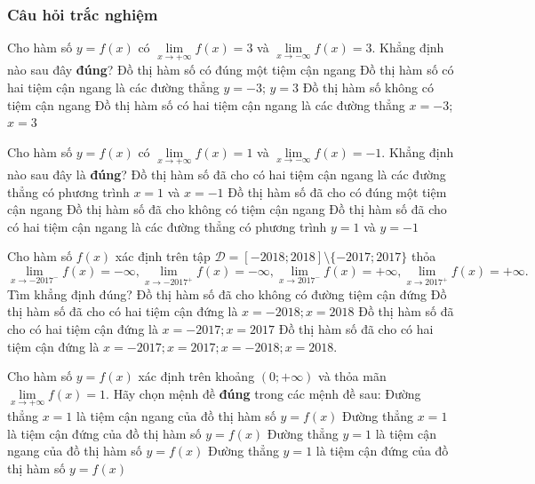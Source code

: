 \subsubsection{Câu hỏi trắc nghiệm}
\begin{ex}%
	Cho hàm số $y=f(x)$ có $\lim\limits_{x\to+\infty} f(x)=3$ và $\lim\limits_{x\to-\infty} f(x)=3$. Khẳng định nào sau đây \textbf{đúng}?
	\choice
	{\True Đồ thị hàm số có đúng một tiệm cận ngang}
	{Đồ thị hàm số có hai tiệm cận ngang là các đường thẳng $y=-3$; $y=3$}
	{Đồ thị hàm số không có tiệm cận ngang}
	{Đồ thị hàm số có hai tiệm cận ngang là các đường thẳng $x=-3$; $x=3$}
\end{ex}
\begin{ex}%
	Cho hàm số $y=f(x)$ có $\lim\limits_{x\to+\infty} f(x)=1$ và $\lim\limits_{x\to-\infty} f(x)=-1$. Khẳng định nào sau đây là \textbf{đúng}?
	\choice
	{Đồ thị hàm số đã cho có hai tiệm cận ngang là các đường thẳng có phương trình $x=1$ và $x=-1$}
	{Đồ thị hàm số đã cho có đúng một tiệm cận ngang}
	{Đồ thị hàm số đã cho không có tiệm cận ngang}
	{\True Đồ thị hàm số đã cho có hai tiệm cận ngang là các đường thẳng có phương trình $y=1$ và $y=-1$}
\end{ex}
\begin{ex}%
	Cho hàm số $f(x)$ xác định trên tập $\mathscr{D}=[-2018;2018]\setminus\{-2017;2017\}$ thỏa
	$$\lim\limits_{x\to-{2017}^-} f(x)=-\infty, \lim\limits_{x\to-{2017}^+} f(x)=-\infty, \lim\limits_{x\to{2017}^-} f(x)=+\infty, \lim\limits_{x\to{2017}^+} f(x)=+\infty.$$
	Tìm khẳng định đúng?
	\choice
	{Đồ thị hàm số đã cho không có đường tiệm cận đứng}
	{Đồ thị hàm số đã cho có hai tiệm cận đứng là $x=-2018;x=2018$}
	{\True Đồ thị hàm số đã cho có hai tiệm cận đứng là $x=-2017;x=2017$}
	{Đồ thị hàm số đã cho có hai tiệm cận đứng là $x=-2017;x=2017;x=-2018;x=2018$.}
\end{ex}
\begin{ex}%
	Cho hàm số $y=f(x)$ xác định trên khoảng $(0;+\infty)$ và thỏa mãn $\lim\limits_{x\to+\infty} f(x)=1$. Hãy chọn mệnh đề \textbf{đúng} trong các mệnh đề sau: 
	\choice
	{Đường thẳng $x=1$ là tiệm cận ngang của đồ thị hàm số $y=f(x)$}
	{Đường thẳng $x=1$ là tiệm cận đứng của đồ thị hàm số $y=f(x)$}
	{\True Đường thẳng $y=1$ là tiệm cận ngang của đồ thị hàm số $y=f(x)$}
	{Đường thẳng $y=1$ là tiệm cận đứng của đồ thị hàm số $y=f(x)$}
\end{ex}
